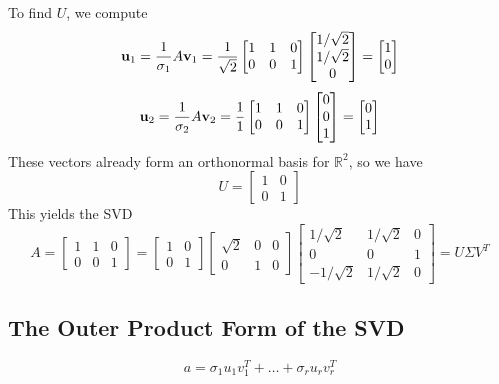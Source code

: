 To find $U$, we compute
\[\mathbf{u}_1=\frac{1}{\sigma_1}A\mathbf{v}_1=\frac{1}{\sqrt{2}}\begin{bmatrix}
        1 & 1 & 0 \\
        0 & 0 & 1
    \end{bmatrix}\begin{bmatrix}
        1/\sqrt{2} \\
        1/\sqrt{2} \\
        {0}
    \end{bmatrix}=\begin{bmatrix}
        1 \\
        {0}
    \end{bmatrix}\]
\[\mathbf{u}_2=\frac{1}{\sigma_2}A\mathbf{v}_2=\frac{1}{1}\begin{bmatrix}
        1 & 1 & 0 \\
        0 & 0 & 1
    \end{bmatrix}\begin{bmatrix}
        0 \\
        0 \\
        1
    \end{bmatrix}=\begin{bmatrix}
        0 \\
        1
    \end{bmatrix}\]
These vectors already form an orthonormal basis for $\mathbb{R}^2$, so we have
\[U=\begin{bmatrix}
        1 & 0 \\
        0 & 1
    \end{bmatrix}\]
This yields the SVD
\[A=\begin{bmatrix}
        1 & 1 & 0 \\
        0 & 0 & 1
    \end{bmatrix}=\begin{bmatrix}
        1 & 0 \\
        0 & 1
    \end{bmatrix}\begin{bmatrix}
        \sqrt{2} & 0 & 0 \\
        0        & 1 & 0
    \end{bmatrix}\begin{bmatrix}
        1/\sqrt{2}  & 1/\sqrt{2} & 0 \\
        0           & 0          & 1 \\
        -1/\sqrt{2} & 1/\sqrt{2} & 0
    \end{bmatrix}=U\Sigma V^T\]

\subsection*{The Outer Product Form of the SVD}
\[a=\sigma_1u_1v_1^T+\dots+\sigma_ru_rv_r^T\]


